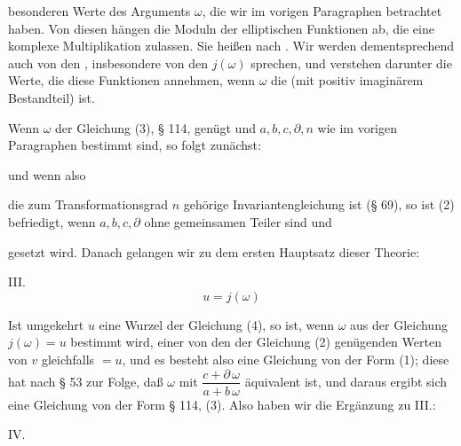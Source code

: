 besonderen Werte des Arguments $\omega$, die wir im vorigen Paragraphen betrachtet haben. Von diesen hängen die Moduln der elliptischen Funktionen ab, die eine komplexe Multiplikation zulassen. Sie heißen nach  . Wir werden dementsprechend auch von den , insbesondere von den  $j(\omega)$ sprechen, und verstehen darunter die Werte, die diese Funktionen annehmen, wenn $\omega$ die  (mit positiv imaginärem Bestandteil)  ist.

Wenn $\omega$ der Gleichung (3), § 114, genügt und $a, b, c, \partial, n$ wie im vorigen Paragraphen bestimmt sind, so folgt zunächst:


und wenn also


die zum Transformationsgrad $n$ gehörige Invariantengleichung ist (§ 69), so ist (2) befriedigt, wenn $a, b, c, \partial$ ohne gemeinsamen Teiler sind und


gesetzt wird. Danach gelangen wir zu dem ersten Hauptsatz dieser Theorie:

III. 
\[
u = j(\omega)
\]


Ist umgekehrt $u$ eine Wurzel der Gleichung (4), so ist, wenn $\omega$ aus der Gleichung $j(\omega) = u$ bestimmt wird, einer von den der Gleichung (2) genügenden Werten von $v$ gleichfalls $= u$, und es besteht also eine Gleichung von der Form (1); diese hat nach § 53 zur Folge, daß $\omega$ mit $\dfrac{c + \partial\,\omega}{a + b\,\omega}$ äquivalent ist, und daraus ergibt sich eine Gleichung von der Form § 114, (3). Also haben wir die Ergänzung zu III.:

IV. 
